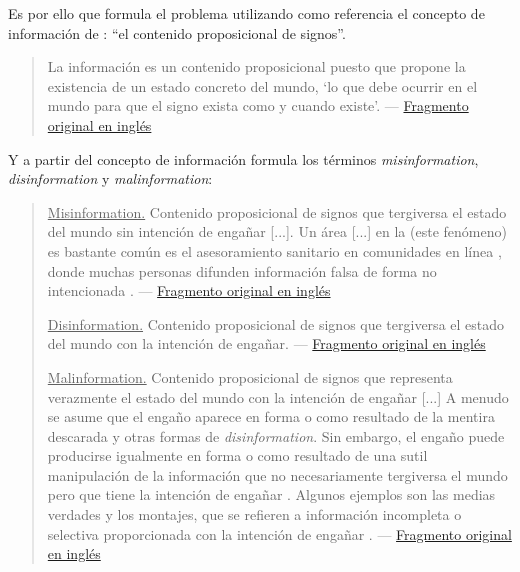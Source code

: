 Es por ello que \citet{Khan2021} formula el problema utilizando como referencia el concepto de información de \citet{Mingers2018}: ``el contenido proposicional de signos''.

\label{frag4esp}
\begin{quotation}
    La información es un contenido proposicional puesto que propone la existencia de un estado concreto del mundo, `lo que debe ocurrir en el mundo para que el signo exista como y cuando existe'. --- \hyperref[frag4eng]{Fragmento original en inglés}
\end{quotation}

Y a partir del concepto de información formula los términos \emph{misinformation}, \emph{disinformation} y \emph{malinformation}:

\label{frag5esp}
\begin{quotation}
    \underline{Misinformation.} Contenido proposicional de signos que tergiversa el estado del mundo sin intención de engañar [...]. Un área [...] en la (este fenómeno) es bastante común es el asesoramiento sanitario en comunidades en línea \citep{Venkatesan2014}, donde muchas personas difunden información falsa de forma no intencionada \citep{Myers2009}. \citep{Khan2021} --- \hyperref[frag5eng]{Fragmento original en inglés} \\

\label{frag6esp}

    \underline{Disinformation.} Contenido proposicional de signos que tergiversa el estado del mundo con la intención de engañar. \citep{Khan2021} --- \hyperref[frag6eng]{Fragmento original en inglés} \\

\label{frag7esp}

    \underline{Malinformation.} Contenido proposicional de signos que representa verazmente el estado del mundo con la intención de engañar [...] A menudo se asume que el engaño aparece en forma o como resultado de la mentira descarada y otras formas de \emph{disinformation}. Sin embargo, el engaño puede producirse igualmente en forma o como resultado de una sutil manipulación de la información que no necesariamente tergiversa el mundo pero que tiene la intención de engañar \citep{McCornack2009,McCornack2014,Wardle2018a}. Algunos ejemplos son las medias verdades y los montajes, que se refieren a información incompleta o selectiva proporcionada con la intención de engañar \citep{Fallis2016}. \citep{Khan2021} --- \hyperref[frag7eng]{Fragmento original en inglés}
\end{quotation}

